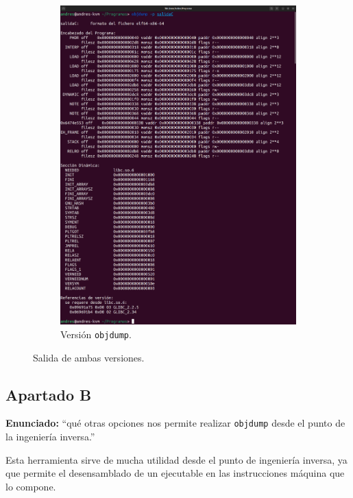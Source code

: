 \documentclass{article}
\begin{document}
\begin{itemize}
\begin{figure}[H]
\begin{subfigure}{0.49\textwidth}
            \includegraphics[width=\textwidth]{imagenes/mergedobjdumpp}
            \caption{Versión \texttt{objdump}.}
        \end{subfigure}
        \caption{Salida de ambas versiones.}
    \end{figure}    

\end{itemize}


\subsection{Apartado B}

\textbf{Enunciado: }``qué otras opciones nos permite realizar \texttt{objdump} desde el punto de la ingeniería inversa.''

\bigskip

Esta herramienta sirve de mucha utilidad desde el punto de ingeniería inversa, ya que permite el desensamblado de un ejecutable en las instrucciones máquina que lo compone.
\end{document}
